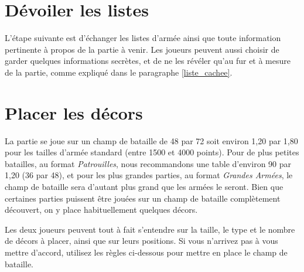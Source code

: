 \section{Dévoiler les listes}

L'étape suivante est d'échanger les listes d'armée ainsi que toute information pertinente à propos de la partie à venir. Les joueurs peuvent aussi choisir de garder quelques informations secrètes, et de ne les révéler qu'au fur et à mesure de la partie, comme expliqué dans le paragraphe \ref{liste_cachee}.

\section{Placer les décors}

La partie se joue sur un champ de bataille de 48{\pouce} par 72{\pouce} soit environ 1,20 {\meter} par 1,80 {\meter} pour les tailles d'armée standard (entre 1500 et 4000 points). Pour de plus petites batailles, au format \emph{Patrouilles}, nous recommandons une table d'environ 90 {\centi\meter} par 1,20 {\meter} (36{\pouce} par 48{\pouce}), et pour les plus grandes parties, au format \emph{Grandes Armées}, le champ de bataille sera d'autant plus grand que les armées le seront. Bien que certaines parties puissent être jouées sur un champ de bataille complètement découvert, on y place habituellement quelques décors.

Les deux joueurs peuvent tout à fait s'entendre sur la taille, le type et le nombre de décors à placer, ainsi que sur leurs positions. Si vous n'arrivez pas à vous mettre d'accord, utilisez les règles ci-dessous pour mettre en place le champ de bataille.

